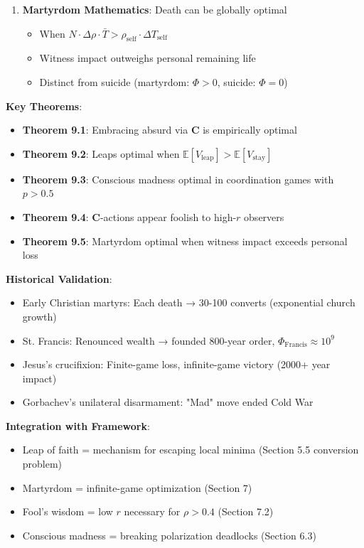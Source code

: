 \documentclass[11pt,a4paper]{article}
\theoremstyle{definition}
\theoremstyle{remark}
\begin{document}
\begin{enumerate}
\begin{mdframed}[backgroundcolor=green!10,linewidth=2pt,linecolor=green!70!black]
\begin{enumerate}[nosep]
\begin{itemize}[nosep]
            \item Biblical "foolishness of God" = low-\(r\) optimization
        \end{itemize}
    \item \textbf{Martyrdom Mathematics}: Death can be globally optimal
        \begin{itemize}[nosep]
            \item When \(N \cdot \Delta\rho \cdot \bar{T} > \rho_{\text{self}} \cdot \Delta T_{\text{self}}\)
            \item Witness impact outweighs personal remaining life
            \item Distinct from suicide (martyrdom: \(\Phi > 0\), suicide: \(\Phi = 0\))
        \end{itemize}
\end{enumerate}

\textbf{Key Theorems}:
\begin{itemize}[nosep]
    \item \textbf{Theorem 9.1}: Embracing absurd via \(\mathbf{C}\) is empirically optimal
    \item \textbf{Theorem 9.2}: Leaps optimal when \(\mathbb{E}[V_{\text{leap}}] > \mathbb{E}[V_{\text{stay}}]\)
    \item \textbf{Theorem 9.3}: Conscious madness optimal in coordination games with \(p > 0.5\)
    \item \textbf{Theorem 9.4}: \(\mathbf{C}\)-actions appear foolish to high-\(r\) observers
    \item \textbf{Theorem 9.5}: Martyrdom optimal when witness impact exceeds personal loss
\end{itemize}

\textbf{Historical Validation}:
\begin{itemize}[nosep]
    \item Early Christian martyrs: Each death → 30-100 converts (exponential church growth)
    \item St. Francis: Renounced wealth → founded 800-year order, \(\Phi_{\text{Francis}} \approx 10^9\)
    \item Jesus's crucifixion: Finite-game loss, infinite-game victory (2000+ year impact)
    \item Gorbachev's unilateral disarmament: "Mad" move ended Cold War
\end{itemize}

\textbf{Integration with Framework}:
\begin{itemize}[nosep]
    \item Leap of faith = mechanism for escaping local minima (Section 5.5 conversion problem)
    \item Martyrdom = infinite-game optimization (Section 7)
    \item Fool's wisdom = low \(r\) necessary for \(\rho > 0.4\) (Section 7.2)
    \item Conscious madness = breaking polarization deadlocks (Section 6.3)
\end{itemize}


\end{mdframed}
\end{enumerate}
\end{document}

